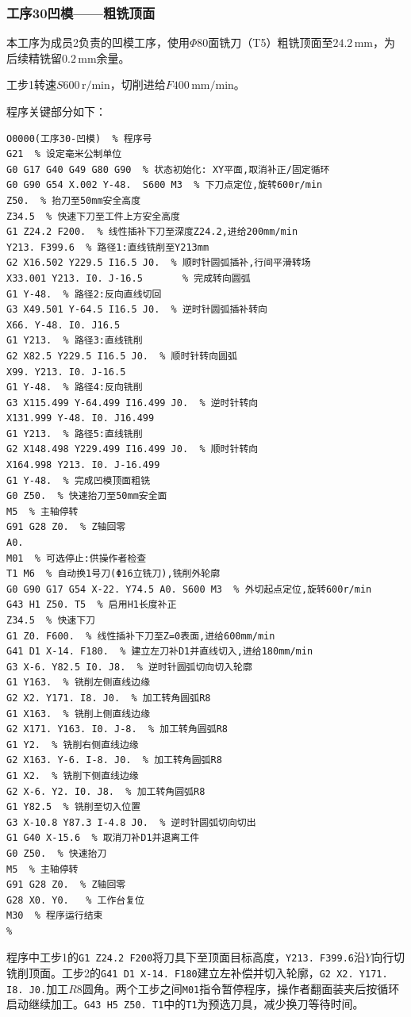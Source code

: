 \documentclass{xautCADreport}
\begin{document}
\subsubsection{工序30凹模——粗铣顶面}

本工序为成员2负责的凹模工序，使用$\Phi80$面铣刀（T5）粗铣顶面至$24.2\,\mathrm{mm}$，为后续精铣留$0.2\,\mathrm{mm}$余量。

工步1转速$S600\,\mathrm{r/min}$，切削进给$F400\,\mathrm{mm/min}$。

程序关键部分如下：

\begin{lstlisting}[caption={工序30凹模粗铣顶面及外轮廓程序（完整程序）}]
%
O0000(工序30-凹模)  % 程序号
G21  % 设定毫米公制单位
G0 G17 G40 G49 G80 G90  % 状态初始化: XY平面,取消补正/固定循环
G0 G90 G54 X.002 Y-48.  S600 M3  % 下刀点定位,旋转600r/min
Z50.  % 抬刀至50mm安全高度
Z34.5  % 快速下刀至工件上方安全高度
G1 Z24.2 F200.  % 线性插补下刀至深度Z24.2,进给200mm/min
Y213. F399.6  % 路径1:直线铣削至Y213mm
G2 X16.502 Y229.5 I16.5 J0.  % 顺时针圆弧插补,行间平滑转场
X33.001 Y213. I0. J-16.5       % 完成转向圆弧
G1 Y-48.  % 路径2:反向直线切回
G3 X49.501 Y-64.5 I16.5 J0.  % 逆时针圆弧插补转向
X66. Y-48. I0. J16.5
G1 Y213.  % 路径3:直线铣削
G2 X82.5 Y229.5 I16.5 J0.  % 顺时针转向圆弧
X99. Y213. I0. J-16.5
G1 Y-48.  % 路径4:反向铣削
G3 X115.499 Y-64.499 I16.499 J0.  % 逆时针转向
X131.999 Y-48. I0. J16.499
G1 Y213.  % 路径5:直线铣削
G2 X148.498 Y229.499 I16.499 J0.  % 顺时针转向
X164.998 Y213. I0. J-16.499
G1 Y-48.  % 完成凹模顶面粗铣
G0 Z50.  % 快速抬刀至50mm安全面
M5  % 主轴停转
G91 G28 Z0.  % Z轴回零
A0.
M01  % 可选停止:供操作者检查
T1 M6  % 自动换1号刀(Φ16立铣刀),铣削外轮廓
G0 G90 G17 G54 X-22. Y74.5 A0. S600 M3  % 外切起点定位,旋转600r/min
G43 H1 Z50. T5  % 启用H1长度补正
Z34.5  % 快速下刀
G1 Z0. F600.  % 线性插补下刀至Z=0表面,进给600mm/min
G41 D1 X-14. F180.  % 建立左刀补D1并直线切入,进给180mm/min
G3 X-6. Y82.5 I0. J8.  % 逆时针圆弧切向切入轮廓
G1 Y163.  % 铣削左侧直线边缘
G2 X2. Y171. I8. J0.  % 加工转角圆弧R8
G1 X163.  % 铣削上侧直线边缘
G2 X171. Y163. I0. J-8.  % 加工转角圆弧R8
G1 Y2.  % 铣削右侧直线边缘
G2 X163. Y-6. I-8. J0.  % 加工转角圆弧R8
G1 X2.  % 铣削下侧直线边缘
G2 X-6. Y2. I0. J8.  % 加工转角圆弧R8
G1 Y82.5  % 铣削至切入位置
G3 X-10.8 Y87.3 I-4.8 J0.  % 逆时针圆弧切向切出
G1 G40 X-15.6  % 取消刀补D1并退离工件
G0 Z50.  % 快速抬刀
M5  % 主轴停转
G91 G28 Z0.  % Z轴回零
G28 X0. Y0.   % 工作台复位
M30  % 程序运行结束
%
\end{lstlisting}

程序中工步1的\texttt{G1 Z24.2 F200}将刀具下至顶面目标高度，\texttt{Y213. F399.6}沿$Y$向行切铣削顶面。工步2的\texttt{G41 D1 X-14. F180}建立左补偿并切入轮廓，\texttt{G2 X2. Y171. I8. J0.}加工$R8$圆角。两个工步之间\texttt{M01}指令暂停程序，操作者翻面装夹后按循环启动继续加工。\texttt{G43 H5 Z50. T1}中的\texttt{T1}为预选刀具，减少换刀等待时间。
\end{document}
